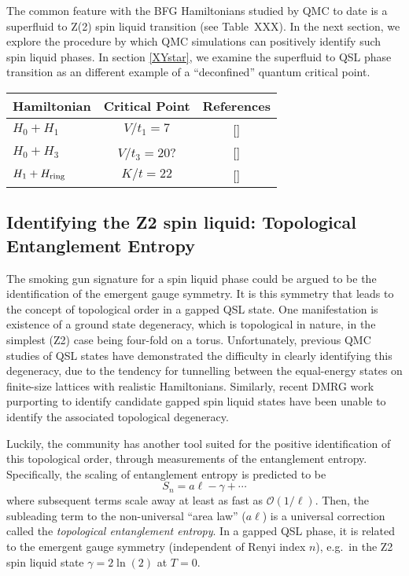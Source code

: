 \documentclass[range]{ar2e}
\begin{document}

The common feature with the BFG Hamiltonians studied by QMC to date is a superfluid to Z(2) spin liquid transition (see Table~XXX).  In the next section, we explore the procedure by which QMC simulations can positively identify such spin liquid phases.  In section \ref{XYstar}, we examine the superfluid to QSL phase transition as an different example of a ``deconfined'' quantum critical point.

\begin{center}
\begin{tabular}{ l | c | c}
  Hamiltonian & Critical Point & References \\
  \hline
  $H_0 + H_1$ & $V/t_1 = 7$ & [\cite{TopoEE}] \\
  $H_0 + H_3$  & $ V/t_3 = 20$? & [\cite{Isakov1,Isakov2}] \\
  $H_1 + H_{\rm ring}$ & $K/t = 22$ & [\cite{Long}]  \\
\end{tabular}
\end{center}

\subsection{Identifying the Z2 spin liquid: Topological Entanglement Entropy}

The smoking gun signature for a spin liquid phase could be argued to be the identification of the emergent gauge symmetry.  It is this symmetry that leads to the concept of topological order in a gapped QSL state.  One manifestation is existence of a ground state degeneracy, which is topological in nature, in the simplest (Z2) case being four-fold on a torus.  Unfortunately, previous QMC studies of QSL states have demonstrated the difficulty in clearly identifying this degeneracy, due to the tendency for tunnelling between the equal-energy states on finite-size lattices with realistic Hamiltonians.  Similarly, recent DMRG work purporting to identify candidate gapped spin liquid states have been unable to identify the associated topological degeneracy.

Luckily, the community has another tool suited for the positive identification of this topological order, through measurements of the entanglement entropy.  Specifically, the scaling of entanglement entropy is predicted to be
\begin{equation}
S_n = a \ell - \gamma + \cdots \label{areaL}
\end{equation}
where subsequent terms scale away at least as fast as $\mathcal{O} (1/\ell)$.  Then, the subleading term to the non-universal ``area law'' ($a \ell$) is a universal correction called the {\it topological entanglement entropy}.  In a gapped QSL phase, it is related to the emergent gauge symmetry (independent\cite{Flammia} of Renyi index $n$), e.g.~in the Z2 spin liquid state $\gamma = 2 \ln(2)$ at $T=0$.
\end{document}
